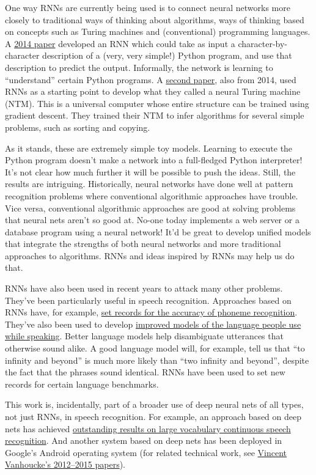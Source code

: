 \documentclass[a4paper,twoside,10pt]{book}
\begin{document}
One way RNNs are currently being used is to connect neural networks more closely to traditional ways of thinking about algorithms, ways of thinking based on concepts such as Turing machines and (conventional) programming languages. A \href{http://arxiv.org/abs/1410.4615}{2014 paper} developed an RNN which could take as input a character-by-character description of a (very, very simple!) Python program, and use that description to predict the output. Informally, the network is learning to ``understand'' certain Python programs. A \href{http://arxiv.org/abs/1410.5401}{second paper}, also from 2014, used RNNs as a starting point to develop what they called a neural Turing machine (NTM). This is a universal computer whose entire structure can be trained using gradient descent. They trained their NTM to infer algorithms for several simple problems, such as sorting and copying.

As it stands, these are extremely simple toy models. Learning to execute the Python program  doesn't make a network into a full-fledged Python interpreter! It's not clear how much further it will be possible to push the ideas. Still, the results are intriguing. Historically, neural networks have done well at pattern recognition problems where conventional algorithmic approaches have trouble. Vice versa, conventional algorithmic approaches are good at solving problems that neural nets aren't so good at. No-one today implements a web server or a database program using a neural network! It'd be great to develop unified models that integrate the strengths of both neural networks and more traditional approaches to algorithms. RNNs and ideas inspired by RNNs may help us do that.

RNNs have also been used in recent years to attack many other problems. They've been particularly useful in speech recognition. Approaches based on RNNs have, for example, \href{http://arxiv.org/abs/1303.5778}{set records for the accuracy of phoneme recognition}. They've also been used to develop \href{http://www.fit.vutbr.cz/~imikolov/rnnlm/thesis.pdf}{improved models of the language people use while speaking}. Better language models help disambiguate utterances that otherwise sound alike. A good language model will, for example, tell us that ``to infinity and beyond'' is much more likely than ``two infinity and beyond'', despite the fact that the phrases sound identical. RNNs have been used to set new records for certain language benchmarks.

This work is, incidentally, part of a broader use of deep neural nets of all types, not just RNNs, in speech recognition. For example, an approach based on deep nets has achieved \href{http://arxiv.org/abs/1309.1501}{outstanding results on large vocabulary continuous speech recognition}. And another system based on deep nets has been deployed in Google's Android operating system (for related technical work, see \href{http://research.google.com/pubs/VincentVanhoucke.html}{Vincent Vanhoucke's 2012--2015 papers}).
\end{document}

